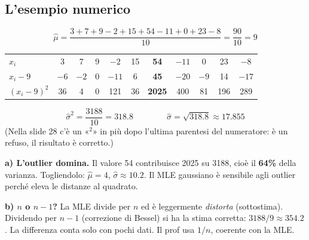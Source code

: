 \subsection{L'esempio numerico}
\begin{esempio}[Stima di $\mu$ e $\sigma$ con $n=10$]
\[
\hat\mu=\frac{3+7+9-2+15+54-11+0+23-8}{10}=\frac{90}{10}=9
\]
\begin{center}\small
\begin{tabular}{l*{10}{c}}
\toprule
$x_i$ & 3 & 7 & 9 & $-2$ & 15 & \textcolor{rosso}{\textbf{54}} & $-11$ & 0 & 23 & $-8$\\
$x_i-9$ & $-6$ & $-2$ & 0 & $-11$ & 6 & \textcolor{rosso}{\textbf{45}} & $-20$ & $-9$ & 14 & $-17$\\
$(x_i-9)^2$ & 36 & 4 & 0 & 121 & 36 & \textcolor{rosso}{\textbf{2025}} & 400 & 81 & 196 & 289\\
\bottomrule
\end{tabular}
\end{center}
\[
\hat\sigma^2=\frac{3188}{10}=318.8\qquad\qquad \hat\sigma=\sqrt{318.8}\approx17.855
\]
(Nella slide 28 c'è un «$^2$» in più dopo l'ultima parentesi del numeratore: è un refuso, il risultato è corretto.)
\end{esempio}


\begin{attenzione}
\textbf{a) L'outlier domina.} Il valore 54 contribuisce 2025 su 3188, cioè il \textbf{64\%} della varianza. Togliendolo: $\hat\mu=4$, $\hat\sigma\approx10.2$. Il MLE gaussiano è sensibile agli outlier perché eleva le distanze al quadrato.

\textbf{b) $n$ o $n-1$?} La MLE divide per $n$ ed è leggermente \emph{distorta} (sottostima). Dividendo per $n-1$ (correzione di Bessel) si ha la stima corretta: $3188/9\approx354.2$. La differenza conta solo con pochi dati. Il prof usa $1/n$, coerente con la MLE.
\end{attenzione}

